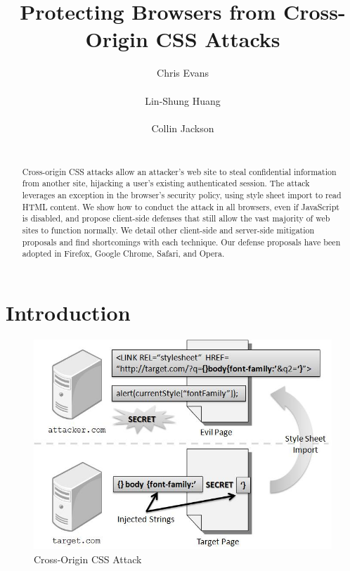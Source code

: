 \documentclass{acm_proc_article-sp}
\begin{document}
\title{Protecting Browsers from Cross-Origin CSS Attacks}
\author{
\alignauthor
Chris Evans\\
      \\
\alignauthor
Lin-Shung Huang\\
      \\
\alignauthor
Collin Jackson\\
      \\
}

\newcommand{\todo}[1]{\textbf{[TODO: #1]}}

\maketitle
\begin{abstract}
Cross-origin CSS attacks allow an attacker's web site to steal confidential information from another site, hijacking a user's existing authenticated session. The attack leverages an exception in the browser's security policy,
using style sheet import to read HTML content. We show how to conduct the attack in all browsers, even if JavaScript is disabled, and propose client-side defenses that still allow the vast majority of web sites to function normally. We detail other client-side and server-side mitigation proposals and find shortcomings with each technique. Our defense proposals have been adopted in Firefox, Google Chrome, Safari, and Opera.
\end{abstract}




\section{Introduction}

\begin{figure}
\centering
\includegraphics[width=\linewidth]{injection.jpg}
\caption{Cross-Origin CSS Attack}
\label{figure:injection}
\end{figure}
\end{document}
